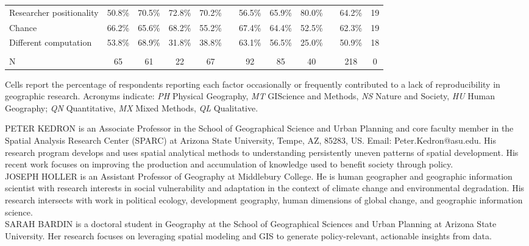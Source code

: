 \documentclass[]{interact}
\theoremstyle{plain}%
\theoremstyle{definition}
\theoremstyle{remark}
\begin{document}
\begin{landscape}
\begin{table}[h]
\begin{threeparttable}
\begin{tabular}{l c c c c c c c c c c c}
         Researcher positionality           & 50.8\% & 70.5\% & 72.8\% & 70.2\% & & 56.5\% & 65.9\% & 80.0\% &  & 64.2\% & 19\\
         Chance                             & 66.2\% & 65.6\% & 68.2\% & 55.2\% & & 67.4\% & 64.4\% & 52.5\% &  & 62.3\% & 19 \\
         Different computation              & 53.8\% & 68.9\% & 31.8\% & 38.8\% & & 63.1\% & 56.5\% & 25.0\% &  & 50.9\% & 18 \\
                                            & & & & & & & & & & &\\
         N                                  & 65 & 61 & 22 & 67 & & 92 & 85 & 40 & & 218 & 0 \\
        \hline
    \end{tabular}
    \begin{tablenotes}
        \footnotesize
        \item Cells report the percentage of respondents reporting each factor occasionally or frequently contributed to a lack of reproducibility in geographic research. Acronyms indicate: \textit{PH} Physical Geography, \textit{MT} GIScience and Methods, \textit{NS} Nature and Society, \textit{HU} Human Geography; \textit{QN} Quantitative, \textit{MX} Mixed Methods, \textit{QL} Qualitative. 
    \end{tablenotes}
    \label{tab:barriers}
    \end{threeparttable}
\end{table}
\end{landscape}
\newpage
\noindent PETER KEDRON is an Associate Professor in the School of Geographical Science and Urban Planning and core faculty member in the Spatial Analysis Research Center (SPARC) at Arizona State University, Tempe, AZ, 85283, US. Email: Peter.Kedron@asu.edu. His research program develops and uses spatial analytical methods to understanding persistently uneven patterns of spatial development. His recent work focuses on improving the production and accumulation of knowledge used to benefit society through policy. \\  
  
\noindent JOSEPH HOLLER is an Assistant Professor of Geography at Middlebury College. He is human geographer and geographic information scientist with research interests in social vulnerability and adaptation in the context of climate change and environmental degradation. His research intersects with work in political ecology, development geography, human dimensions of global change, and geographic information science. \\
  
\noindent SARAH BARDIN is a doctoral student in Geography at the School of Geographical Sciences and Urban Planning at Arizona State University. Her research focuses on leveraging spatial modeling and GIS to generate policy-relevant, actionable insights from data.
\end{document}
